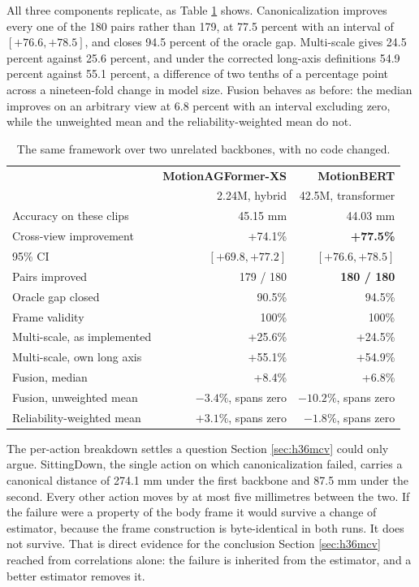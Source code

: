 \documentclass[12pt,a4paper]{report}
\begin{document}
All three components replicate, as Table \ref{tab:backbone} shows. Canonicalization improves every one of the 180 pairs rather than 179, at 77.5 percent with an interval of $[+76.6, +78.5]$, and closes 94.5 percent of the oracle gap. Multi-scale gives 24.5 percent against 25.6 percent, and under the corrected long-axis definitions 54.9 percent against 55.1 percent, a difference of two tenths of a percentage point across a nineteen-fold change in model size. Fusion behaves as before: the median improves on an arbitrary view at 6.8 percent with an interval excluding zero, while the unweighted mean and the reliability-weighted mean do not.

\begin{table}[htbp]
\centering
\caption{The same framework over two unrelated backbones, with no code changed.}
\label{tab:backbone}
{\fontsize{10}{12}\selectfont
\begin{tabular}{lrr}
\hline
 & \textbf{MotionAGFormer-XS} & \textbf{MotionBERT} \\
 & 2.24M, hybrid & 42.5M, transformer \\
\hline
Accuracy on these clips & 45.15 mm & 44.03 mm \\
\hline
Cross-view improvement & +74.1\% & \textbf{+77.5\%} \\
95\% CI & $[+69.8, +77.2]$ & $[+76.6, +78.5]$ \\
Pairs improved & 179 / 180 & \textbf{180 / 180} \\
Oracle gap closed & 90.5\% & 94.5\% \\
Frame validity & 100\% & 100\% \\
\hline
Multi-scale, as implemented & +25.6\% & +24.5\% \\
Multi-scale, own long axis & +55.1\% & +54.9\% \\
\hline
Fusion, median & +8.4\% & +6.8\% \\
Fusion, unweighted mean & $-3.4\%$, spans zero & $-10.2\%$, spans zero \\
Reliability-weighted mean & $+3.1\%$, spans zero & $-1.8\%$, spans zero \\
\hline
\end{tabular}}
\end{table}

The per-action breakdown settles a question Section \ref{sec:h36mcv} could only argue. SittingDown, the single action on which canonicalization failed, carries a canonical distance of 274.1 mm under the first backbone and 87.5 mm under the second. Every other action moves by at most five millimetres between the two. If the failure were a property of the body frame it would survive a change of estimator, because the frame construction is byte-identical in both runs. It does not survive. That is direct evidence for the conclusion Section \ref{sec:h36mcv} reached from correlations alone: the failure is inherited from the estimator, and a better estimator removes it.
\end{document}
